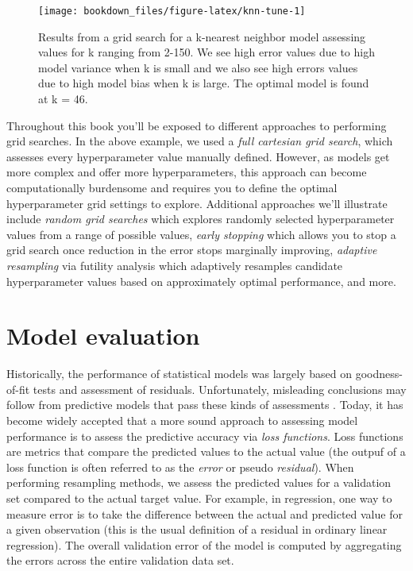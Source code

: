 \documentclass[]{krantz}
\begin{document}
\begin{figure}

{\centering \texttt{[image: bookdown\_files/figure-latex/knn-tune-1]} 

}

\caption{Results from a grid search for a k-nearest neighbor model assessing values for k ranging from 2-150.  We see high error values due to high model variance when k is small and we also see high errors values due to high model bias when k is large.  The optimal model is found at k = 46.}\label{fig:knn-tune}
\end{figure}

Throughout this book you'll be exposed to different approaches to performing grid searches. In the above example, we used a \emph{full cartesian grid search}, which assesses every hyperparameter value manually defined. However, as models get more complex and offer more hyperparameters, this approach can become computationally burdensome and requires you to define the optimal hyperparameter grid settings to explore. Additional approaches we'll illustrate include \emph{random grid searches} \citep{bergstra2012random} which explores randomly selected hyperparameter values from a range of possible values, \emph{early stopping} which allows you to stop a grid search once reduction in the error stops marginally improving, \emph{adaptive resampling} via futility analysis \citep{kuhn2014futility} which adaptively resamples candidate hyperparameter values based on approximately optimal performance, and more.

\hypertarget{model-eval}{%
\section{Model evaluation}\label{model-eval}}

Historically, the performance of statistical models was largely based on goodness-of-fit tests and assessment of residuals. Unfortunately, misleading conclusions may follow from predictive models that pass these kinds of assessments \citep{breiman2001statistical}. Today, it has become widely accepted that a more sound approach to assessing model performance is to assess the predictive accuracy via \emph{loss functions}. Loss functions are metrics that compare the predicted values to the actual value (the outpuf of a loss function is often referred to as the \emph{error} or pseudo \emph{residual}). When performing resampling methods, we assess the predicted values for a validation set compared to the actual target value. For example, in regression, one way to measure error is to take the difference between the actual and predicted value for a given observation (this is the usual definition of a residual in ordinary linear regression). The overall validation error of the model is computed by aggregating the errors across the entire validation data set.
\end{document}
